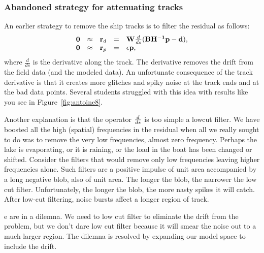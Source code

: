 \subsubsection{Abandoned strategy for attenuating tracks}
An earlier strategy to remove the ship tracks is to filter the
residual as follows:
\begin{equation}
  \begin{array}{lllll}
    \bold 0 &\approx& \bold r_d &=& \bold W \frac{d}{ds}( \bold B \bold {H^{-1}} \bold p - \bold d
    ),\\
    \bold 0 &\approx& \bold r_p &=& \epsilon \bold p,
  \end{array} \label{eqn:eq5}
\end{equation}
where $\frac{d}{ds}$ is the derivative along the track. The derivative 
removes the drift from the field data (and the modeled data).
An unfortunate consequence of the track derivative
is that it creates more glitches and spiky noise at the track ends and
at the bad data points.
Several students struggled with this idea with results
like you see in Figure~\ref{fig:antoine8}.

\par
Another explanation is that the operator $d\over ds$ is too simple a lowcut filter.
We have boosted all the high (spatial) frequencies in the residual
when all we really sought to do was to remove the very low frequencies, almost zero frequency.
Perhaps the lake is evaporating, or it is raining,
or the load in the boat has been changed or shifted.
Consider the filters that would remove only low frequencies
leaving higher frequencies alone.
Such filters are a positive impulse of unit area accompanied
by a long negative blob, also of unit area.
The longer the blob, the narrower the low cut filter.
Unfortunately, the longer the blob, the more nasty spikes it will catch.
After low-cut filtering, noise bursts affect a longer region of track.

\par

e are in a dilemna.   We need to low cut filter to eliminate the drift from the problem,
but we don't dare low cut filter because it will smear the noise out to a much larger region.
The dilemna is resolved by expanding our model space to include the drift.

